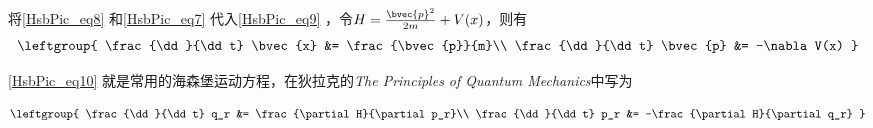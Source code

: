 将\autoref{HsbPic_eq8} 和\autoref{HsbPic_eq7} 代入\autoref{HsbPic_eq9} ，令$H=\frac{\bvec{p}^2}{2m}+V(x)$，则有
\begin{equation}\label{HsbPic_eq10}
\leftgroup{
    \frac{\dd}{\dd t} \bvec{x} &= \frac{\bvec{p}}{m}\\
    \frac{\dd}{\dd t} \bvec{p} &= -\nabla V(x)
}
\end{equation}


\autoref{HsbPic_eq10} 就是常用的海森堡运动方程，在狄拉克的\textsl{The Principles of Quantum Mechanics}中写为

\begin{equation}\label{HsbPic_eq11}
\leftgroup{
    \frac{\dd}{\dd t} q_r &= \frac{\partial H}{\partial p_r}\\
    \frac{\dd}{\dd t} p_r &= -\frac{\partial H}{\partial q_r} 
}
\end{equation}














